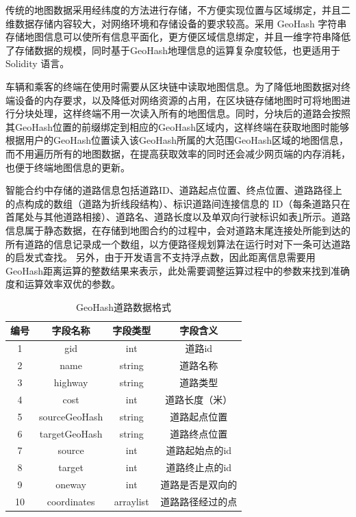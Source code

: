 传统的地图数据采用经纬度的方法进行存储，不方便实现位置与区域绑定，并且二维数据存储内容较大，对网络环境和存储设备的要求较高。采用 GeoHash 字符串存储地图信息可以使所有信息平面化，更方便区域信息绑定，并且一维字符串降低了存储数据的规模，同时基于GeoHash地理信息的运算复杂度较低，也更适用于 Solidity 语言。

车辆和乘客的终端在使用时需要从区块链中读取地图信息。为了降低地图数据对终端设备的内存要求，以及降低对网络资源的占用，在区块链存储地图时可将地图进行分块处理，这样终端不用一次读入所有的地图信息。同时，分块后的道路会按照其GeoHash位置的前缀绑定到相应的GeoHash区域内，这样终端在获取地图时能够根据用户的GeoHash位置读入该GeoHash所属的大范围GeoHash区域的地图信息，而不用遍历所有的地图数据，在提高获取效率的同时还会减少网页端的内存消耗，也便于终端地图信息的更新。

智能合约中存储的道路信息包括道路ID、道路起点位置、终点位置、道路路径上的点构成的数组（道路为折线段结构）、标识道路间连接信息的 ID（每条道路只在首尾处与其他道路相接）、道路名、道路长度以及单双向行驶标识如表\ref{tab:roadFormat}所示。道路信息属于静态数据，在存储到地图合约的过程中，会对道路末尾连接处所能到达的所有道路的信息记录成一个数组，以方便路径规划算法在运行时对下一条可达道路的启发式查找。
另外，由于开发语言不支持浮点数，因此距离信息需要用GeoHash距离运算的整数结果来表示，此处需要调整运算过程中的参数来找到准确度和运算效率双优的参数。

\begin{table}
  \centering
  \caption{GeoHash道路数据格式}\label{tab:roadFormat}
  \begin{tabular*}{0.9\textwidth}{@{\extracolsep{\fill}}cccc}
  \toprule
    编号    &字段名称 &字段类型 &字段含义 \\
  \midrule
    1    &gid &int &道路id\\
    2    &name &string &道路名称\\
    3    &highway &string &道路类型\\
    4    &cost &int &道路长度（米）\\
    5    &sourceGeoHash &string &道路起点位置\\
    6    &targetGeoHash &string &道路终点位置\\
    7    &source &int &道路起始点的id\\
    8    &target &int &道路终止点的id\\
    9    &oneway &int &道路是否是双向的\\
    10    &coordinates &arraylist &道路路径经过的点\\
  \bottomrule
  \end{tabular*}
\end{table}

